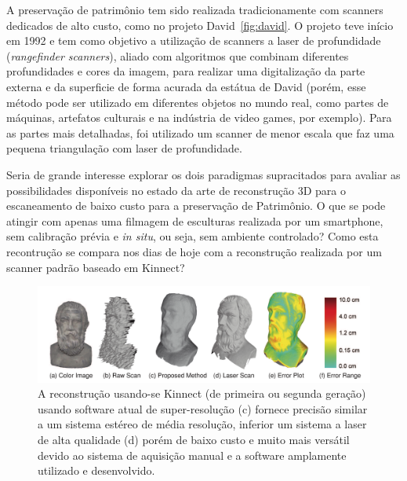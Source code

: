 A preservação de patrimônio tem sido realizada tradicionamente com scanners
dedicados de alto custo, como no projeto David~\ref{fig:david}.
O projeto teve início em 1992 e tem como objetivo a utilização de scanners a laser de profundidade
({\it rangefinder scanners}), aliado com algoritmos que combinam diferentes profundidades e cores da imagem, 
para realizar uma digitalização da parte externa e da superficie de forma acurada da estátua de David 
(porém, esse método pode ser utilizado em diferentes objetos no mundo real, 
como partes de máquinas, artefatos culturais e na indústria de video games, por exemplo). 
Para as partes mais detalhadas, foi utilizado um scanner de menor escala que faz uma pequena 
triangulação com laser de profundidade.

Seria de grande interesse explorar os dois paradigmas supracitados
para avaliar as possibilidades disponíveis no estado da arte de reconstrução 3D
para o escaneamento de baixo custo para a preservação de Patrimônio. O que se
pode atingir com apenas uma filmagem de esculturas realizada por um smartphone,
sem calibração prévia e \emph{in situ}, ou seja, sem ambiente controlado?  Como
esta recontrução se compara nos dias de hoje com a reconstrução realizada por um
scanner padrão baseado em Kinnect?

\begin{figure}[!h]
	\centering
	\includegraphics[width=1\linewidth]{figs/kinect-vs-usual.png}
	\caption{%
    A reconstrução usando-se Kinnect (de primeira ou segunda geração) usando
    software atual de super-resolução (c) fornece precisão similar a um sistema estéreo de média
    resolução, inferior um sistema a laser de alta qualidade (d) porém de baixo custo e
    muito mais versátil devido ao sistema de aquisição manual e a software
    amplamente utilizado e
    desenvolvido\cite{Cui:Theobalt:etal:PAMI2013,Pajdla:etal:ICCV2011}.
	}\label{fig:rec3d:comparacao}
\end{figure}

